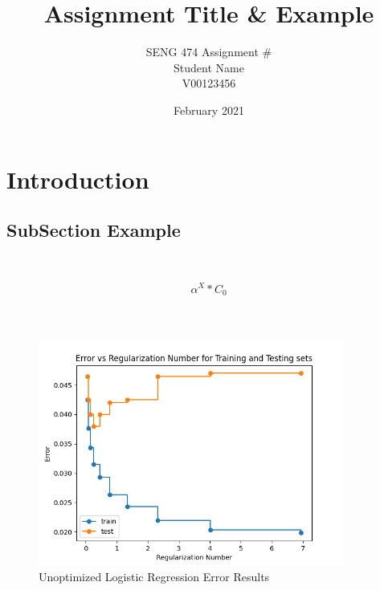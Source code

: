 \documentclass{article}
\title{Assignment Title \& Example}
\author{SENG 474 Assignment \# \\Student Name \\ V00123456}
\date{February 2021}
\begin{document}
\maketitle

\section{Introduction}


\subsection{SubSection Example}\\

\begin{equation}
    \alpha^X * C_0
\end{equation}
\\ \\


    \begin{figure}[h]
    \includegraphics[width=1.0\linewidth, height=7.5cm]{Graphs/Unoptimized Logistic Regression.png} 
    \caption{Unoptimized Logistic Regression Error Results}
    \label{fig: Unotimized LR Results}
    \end{figure}
\end{document}
